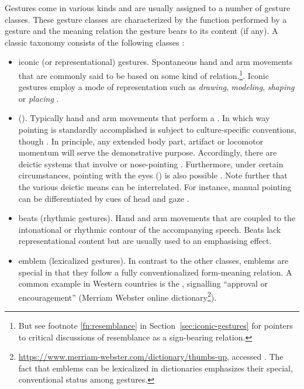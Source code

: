 \documentclass[output=paper]{langsci/langscibook}
\begin{document}
Gestures come in various kinds and are usually assigned to a number of gesture classes.
%
These gesture classes are characterized by the function performed by a gesture and the meaning relation the gesture bears to its content (if any).
%
A classic taxonomy consists of the following classes \citep{McNeill:1992}:
%
\begin{itemize}
\item iconic (or representational)   gestures. Spontaneous hand and arm movements that are commonly said to be based on some kind of   relation.\footnote{But see footnote \ref{fn:resemblance} in Section~\ref{sec:iconic-gestures} for pointers to critical discussions of resemblance as a sign-bearing relation.}. Iconic gestures employ a mode of representation such as \textit{drawing}, \textit{modeling}, \textit{shaping} or \textit{placing} \citep{Streeck:2008,Mueller:1998}.
\item {} (). Typically hand and arm movements that perform a . 
%
In which way pointing is standardly accomplished is subject to culture-specific conventions, though \citep{Wilkins:2003}. 
%
In principle, any extended body part, artifact or locomotor momentum will serve the demonstrative purpose. 
%
Accordingly, there are deictic systems that involve  \citep{Enfield:2001} or nose-pointing \citep{Cooperrider:Nunez:2012}. 
%
Furthermore, under certain circumstances, pointing with the eyes () is also possible \citep{Hadjikhani:Hoge:Snyder:de:Gelder:2008}. 
%
Note further that the various deictic means can be interrelated. For instance, manual pointing can be differentiated by cues of head and gaze \citep{Butterworth:Itakura:2000}.
\item beats  (rhythmic gestures). Hand and arm movements that are coupled to the intonational or rhythmic contour of the accompanying speech. Beats lack representational content but are usually used to an emphasising effect.
\item emblem   (lexicalized gestures). In contrast to the other classes, emblems are special in that they follow a fully conventionalized form-meaning relation. A common example in Western countries is the , signalling \enquote{approval or encouragement} (Merriam Webster online dictionary\footnote{\url{https://www.merriam-webster.com/dictionary/thumbs-up}, accessed . The fact that emblems can be lexicalized in dictionaries emphasizes their special, conventional status among gestures.}).
\end{itemize}
\end{document}
